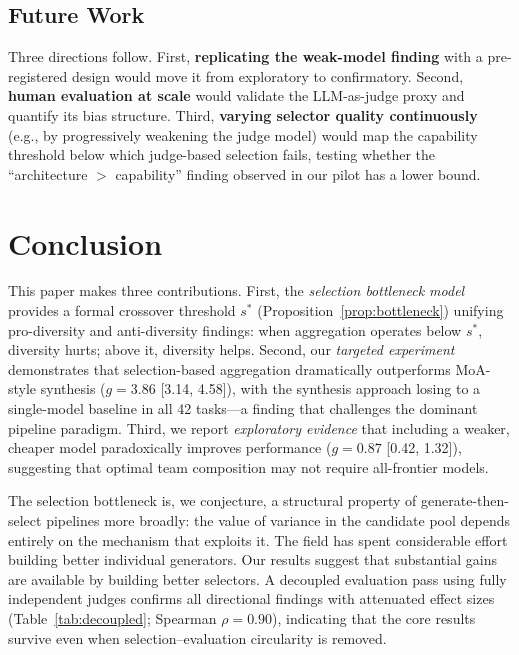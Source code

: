 \documentclass[10pt,twocolumn]{article}
\theoremstyle{remark}
\begin{document}
\subsection{Future Work}
\label{sec:future}

Three directions follow. First, \textbf{replicating the weak-model finding} with a pre-registered design would move it from exploratory to confirmatory. Second, \textbf{human evaluation at scale} would validate the LLM-as-judge proxy and quantify its bias structure. Third, \textbf{varying selector quality continuously} (e.g., by progressively weakening the judge model) would map the capability threshold below which judge-based selection fails, testing whether the ``architecture $>$ capability'' finding observed in our pilot has a lower bound.

\section{Conclusion}
\label{sec:conclusion}

This paper makes three contributions. First, the \emph{selection bottleneck model} provides a formal crossover threshold $s^*$ (Proposition~\ref{prop:bottleneck}) unifying pro-diversity and anti-diversity findings: when aggregation operates below $s^*$, diversity hurts; above it, diversity helps. Second, our \emph{targeted experiment} demonstrates that selection-based aggregation dramatically outperforms MoA-style synthesis ($g = 3.86$ [3.14, 4.58]), with the synthesis approach losing to a single-model baseline in all 42 tasks---a finding that challenges the dominant pipeline paradigm. Third, we report \emph{exploratory evidence} that including a weaker, cheaper model paradoxically improves performance ($g = 0.87$ [0.42, 1.32]), suggesting that optimal team composition may not require all-frontier models.

The selection bottleneck is, we conjecture, a structural property of generate-then-select pipelines more broadly: the value of variance in the candidate pool depends entirely on the mechanism that exploits it. The field has spent considerable effort building better individual generators. Our results suggest that substantial gains are available by building better selectors. A decoupled evaluation pass using fully independent judges confirms all directional findings with attenuated effect sizes (Table~\ref{tab:decoupled}; Spearman $\rho = 0.90$), indicating that the core results survive even when selection--evaluation circularity is removed.
\end{document}
